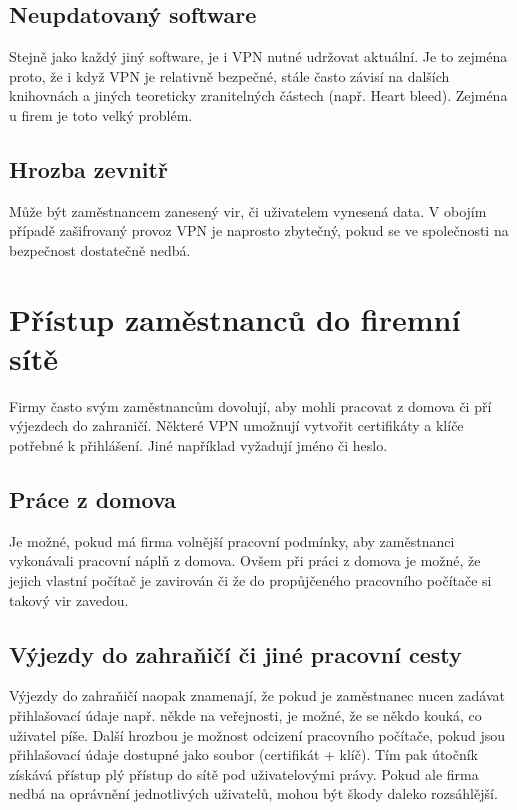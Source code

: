 \documentclass[thesis=B,czech]{FITthesis}[2012/06/26]
\begin{document}
    \subsection{Neupdatovaný software}
      Stejně jako každý jiný software, je i VPN nutné udržovat aktuální. Je to zejména proto, že i když VPN je relativně bezpečné, stále často závisí na dalších knihovnách a jiných teoreticky zranitelných částech (např. Heart bleed). Zejména u firem je toto velký problém.

    \subsection{Hrozba zevnitř}
      Může být zaměstnancem zanesený vir, či uživatelem vynesená data. V obojím případě zašifrovaný provoz VPN je naprosto zbytečný, pokud se ve společnosti na bezpečnost dostatečně nedbá.

\section{Přístup zaměstnanců do firemní sítě}

  Firmy často svým zaměstnancům dovolují, aby mohli pracovat z domova či pří výjezdech do zahraničí. Některé VPN umožnují vytvořit certifikáty a klíče potřebné k přihlášení. Jiné například vyžadují jméno či heslo.

  \subsection{Práce z domova}

    Je možné, pokud má firma volnější pracovní podmínky, aby zaměstnanci vykonávali pracovní náplň z domova. Ovšem při práci z domova je možné, že jejich vlastní počítač je zavirován či že do propůjčeného pracovního počítače si takový vir zavedou.

  \subsection{Výjezdy do zahraňičí či jiné pracovní cesty}

    Výjezdy do zahraňičí naopak znamenají, že pokud je zaměstnanec nucen zadávat přihlašovací údaje např. někde na veřejnosti, je možné, že se někdo kouká, co uživatel píše. Další hrozbou je možnost odcizení pracovního počítače, pokud jsou přihlašovací údaje dostupné jako soubor (certifikát + klíč). Tím pak útočník získává přístup plý přístup do sítě pod uživatelovými právy.
    Pokud ale firma nedbá na oprávnění jednotlivých uživatelů, mohou být škody daleko rozsáhlější.
\end{document}
